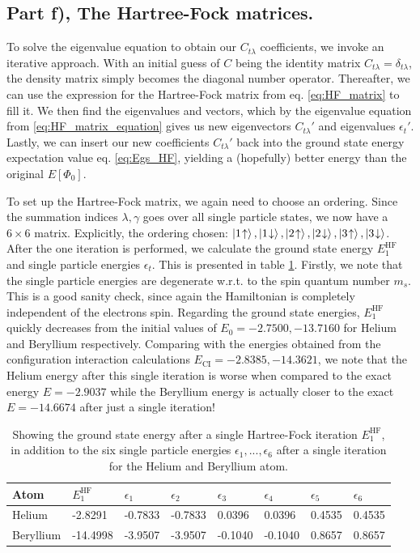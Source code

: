\documentclass{article}
\newcommand{\upst}[1]{#1\hspace{-2px}\uparrow}
\newcommand{\downst}[1]{#1\hspace{-2px}\downarrow}
\newcommand{\hafo}[1]{#1^{\text{HF}}}
\begin{document}
\subsection*{Part f), The Hartree-Fock matrices.}
    To solve the eigenvalue equation to obtain our $C_{t\lambda}$ coefficients, we invoke an iterative approach. With an initial guess of $C$ being the identity matrix $C_{t\lambda} = \delta_{t\lambda}$, the density matrix simply becomes the diagonal number operator. Thereafter, we can use the expression for the Hartree-Fock matrix from eq. \eqref{eq:HF_matrix} to fill it. We then find the eigenvalues and vectors, which by the eigenvalue equation from \eqref{eq:HF_matrix_equation} gives us new eigenvectors $C_{t\lambda}'$ and eigenvalues $\epsilon_t'$. Lastly, we can insert our new coefficients $C_{t\lambda}'$ back into the ground state energy expectation value eq. \eqref{eq:Egs_HF}, yielding a (hopefully) better energy than the original $E[\Phi_0]$. 
    
    To set up the Hartree-Fock matrix, we again need to choose an ordering. Since the summation indices $\lambda,\gamma$ goes over all single particle states, we now have a $6 \times 6$ matrix. Explicitly, the ordering chosen: $\ket{\upst{1}}, \ket{\downst{1}}, \ket{\upst{2}}, \ket{\downst{2}}, \ket{\upst{3}}, \ket{\downst{3}}$. After the one iteration is performed, we calculate the ground state energy $\hafo{E_1}$ and single particle energies $\epsilon_t$. This is presented in table \ref{tab:HF_E}. Firstly, we note that the single particle energies are degenerate w.r.t. to the spin quantum number $m_s$. This is a good sanity check, since again the Hamiltonian is completely independent of the electrons spin. Regarding the ground state energies, $\hafo{E_1}$ quickly decreases from the initial values of $E_0 = -2.7500, -13.7160$ for Helium and Beryllium respectively. Comparing with the energies obtained from the configuration interaction calculations $E_{\text{CI}} = -2.8385, -14.3621$, we note that the Helium energy after this single iteration is worse when compared to the exact energy $E = -2.9037$ while the Beryllium energy is actually closer to the exact $E = -14.6674$ after just a single iteration!
    
    \begin{table}[H]
        \centering
        \begin{tabular}{l|l|l|l|l|l|l|l}
        Atom      &  $\hafo{E_1}$ & $\epsilon_1$ & $\epsilon_2$ & $\epsilon_3$ & $\epsilon_4$ & $\epsilon_5$ & $\epsilon_6$ \\
        \hline
        Helium    & -2.8291     & -0.7833    & -0.7833  & 0.0396  & 0.0396 & 0.4535 & 0.4535   \\
        Beryllium & -14.4998     & -3.9507    &  -3.9507 & -0.1040  &  -0.1040 & 0.8657 & 0.8657 
        \end{tabular}
        \caption{Showing the ground state energy after a single Hartree-Fock iteration $\hafo{E_1}$, in addition to the six single particle energies $\epsilon_1, ... , \epsilon_6$ after a single iteration for the Helium and Beryllium atom. }\label{tab:HF_E}
    \end{table}
\end{document}
